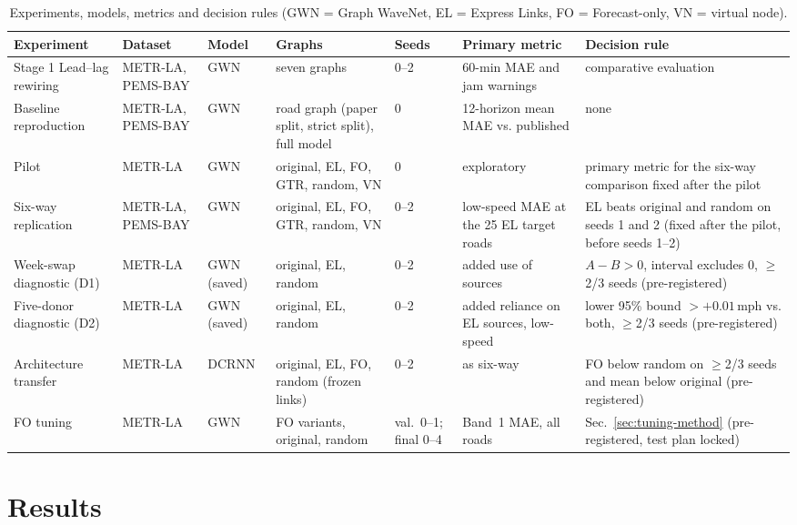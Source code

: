 \documentclass[journal]{IEEEtran}
\newcommand{\ms}{\,mph}
\begin{document}
\begin{table}[!t]
\centering
\caption{Experiments, models, metrics and decision rules (GWN = Graph WaveNet, EL = Express Links, FO = Forecast-only, VN = virtual node).}
\label{tab:protocols}
\footnotesize
\begin{tabular}{@{}p{2.35cm}p{1.45cm}p{1.35cm}p{2.8cm}p{1.1cm}p{3.0cm}p{3.55cm}@{}}
\toprule
Experiment & Dataset & Model & Graphs & Seeds & Primary metric & Decision rule \\
\midrule
Stage 1 Lead--lag rewiring & METR-LA, PEMS-BAY & GWN & seven graphs & 0--2 & 60-min MAE and jam warnings & comparative evaluation \\
Baseline reproduction & METR-LA, PEMS-BAY & GWN & road graph (paper split, strict split), full model & 0 & 12-horizon mean MAE vs. published & none \\
Pilot & METR-LA & GWN & original, EL, FO, GTR, random, VN & 0 & exploratory & primary metric for the six-way comparison fixed after the pilot \\
Six-way replication & METR-LA, PEMS-BAY & GWN & original, EL, FO, GTR, random, VN & 0--2 & low-speed MAE at the 25 EL target roads & EL beats original and random on seeds 1 and 2 (fixed after the pilot, before seeds 1--2) \\
Week-swap diagnostic (D1) & METR-LA & GWN (saved) & original, EL, random & 0--2 & added use of sources & $A-B>0$, interval excludes 0, $\ge$2/3 seeds (pre-registered) \\
Five-donor diagnostic (D2) & METR-LA & GWN (saved) & original, EL, random & 0--2 & added reliance on EL sources, low-speed & lower 95\% bound $>{+}0.01$\ms{} vs. both, $\ge$2/3 seeds (pre-registered) \\
Architecture transfer & METR-LA & DCRNN & original, EL, FO, random (frozen links) & 0--2 & as six-way & FO below random on $\ge$2/3 seeds and mean below original (pre-registered) \\
FO tuning & METR-LA & GWN & FO variants, original, random & val.\ 0--1; final 0--4 & Band~1 MAE, all roads & Sec.~\ref{sec:tuning-method} (pre-registered, test plan locked) \\
\bottomrule
\end{tabular}
\end{table}

\section{Results}\label{sec:results}
\end{document}
